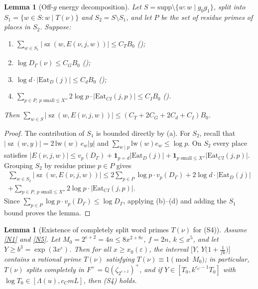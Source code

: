 \documentclass[11pt]{amsart}
\newcommand{\Q}{\mathbb{Q}}
\newcommand{\eps}{\varepsilon}
\DeclareMathOperator{\sz}{sz}
\theoremstyle{plain}
\newtheorem{lemma}[theorem]{Lemma}
\theoremstyle{definition}
\numberwithin{equation}{section}
\begin{document}
\begin{lemma}[Off-$g$ energy decomposition]\label{lem:C2off}
Let $S=\mathrm{supp}\setminus\{w:w\mid g_0g_1\}$, split into $S_1=\{w\in S:w\mid T(\nu)\}$ and
$S_2=S\setminus S_1$, and let $P$ be the set of residue primes of places in $S_2$. Suppose:
\begin{enumerate}[label=(\alph*)]
\item $\sum_{w\in S_1}|\sz(w,E(\nu,j,w))|\le C_T B_0$ ();
\item $\log D_\Gamma(\nu)\le C_G B_0$ ();
\item $\log d\cdot|\mathrm{Eat}_D(j)|\le C_d B_0$ ();
\item $\sum_{p\in P,\ p\text{ small}\le X''}2\log p\cdot|\mathrm{Eat}_{CI}(j,p)|\le C_I B_0$ ().
\end{enumerate}
Then $\sum_{w\in S}|\sz(w,E(\nu,j,w))|\le (C_T+2C_G+2C_d+C_I)B_0$.
\end{lemma}

\begin{proof}
The contribution of $S_1$ is bounded directly by (a). For $S_2$, recall that
$|\sz(w,y)|=2\,\mathrm{lw}(w)\,e_w|y|$ and $\sum_{w\mid p}\mathrm{lw}(w)e_w\le\log p$. On $S_2$
every place satisfies $|E(\nu,j,w)|\le v_p(D_\Gamma)+\mathbf{1}_{p=d}|\mathrm{Eat}_D(j)|+
\mathbf{1}_{p\text{ small}\le X''}|\mathrm{Eat}_{CI}(j,p)|$. Grouping $S_2$ by residue prime
$p\in P$ gives
\begin{multline*}
\sum_{w\in S_2}|\sz(w,E(\nu,j,w))|\le 2\sum_{p\in P}\log p\cdot v_p(D_\Gamma)
+2\log d\cdot|\mathrm{Eat}_D(j)|\\
+\sum_{p\in P,\ p\text{ small}\le X''}2\log p\cdot|\mathrm{Eat}_{CI}(j,p)|.
\end{multline*}
Since $\sum_{p\in P}\log p\cdot v_p(D_\Gamma)\le\log D_\Gamma$, applying (b)--(d) and adding the
$S_1$ bound proves the lemma.
\end{proof}

\begin{lemma}[Existence of completely split word primes $T(\nu)$ for (S4)]\label{lem:wordprimes}
Assume \ref{N1} and \ref{N5}. Let $M_0=2^{e+2}=4n\le 8x^{2+8\eps}$, $f=2n$, $k\le x^5$, and let
$Y\ge b^3=\exp(3x^\eps)$. Then for all $x\ge x_0(\eps)$, the interval
$\bigl[Y,\,Y\bigl(1+\frac{1}{fk}\bigr)\bigr]$ contains a rational prime $T(\nu)$ satisfying
$T(\nu)\equiv 1\pmod{M_0}$; in particular, $T(\nu)$ splits completely in
$F^+=\Q(\zeta_{2^{e+2}})^+$, and if $Y\in[T_0,k^{c_C-1}T_0]$ with
$\log T_0\in[\Lambda(u),c_C mL]$, then \textup{(S4)} holds.
\end{lemma}
\end{document}
